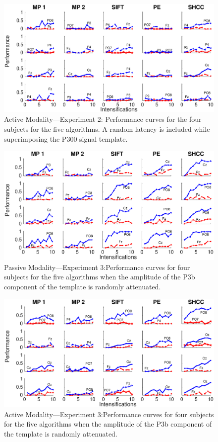 \documentclass[brainsci,article,accept,moreauthors,pdftex,10pt,a4paper]{mdpi}
\begin{document}
\begin{figure}[H]
\centering
\includegraphics[width=16cm]{images/2-2.eps}
\caption{{Active Modality---Experiment 2}: Performance curves for the four subjects for the five algorithms.  A random latency is included while superimposing the P300 signal template.}
\label{fig:2-2}
\end{figure}

 \vspace{-6pt}


\begin{figure}[H]
\centering
\includegraphics[width=16cm]{images/1-3.eps}
\caption{{Passive Modality---Experiment 3}:Performance curves for four subjects for the five algorithms when the amplitude of the P3b component of the template is randomly attenuated. }
\label{fig:1-3}
\end{figure}
 \vspace{-6pt}
\begin{figure}[H]
\centering
\includegraphics[width=16cm]{images/2-3.eps}
\caption{{Active Modality---Experiment 3}:Performance curves for four subjects for the five algorithms when the amplitude of the P3b component of the template is randomly attenuated. }
\label{fig:2-3}
\end{figure}
\end{document}
